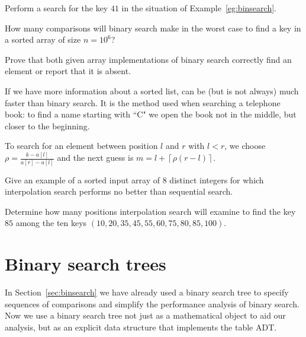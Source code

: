 \begin{Exercise}
\label{ex:binsearch}
Perform a search for the key $41$ in the situation of 
Example~\ref{eg:binsearch}.
\end{Exercise}

\begin{Exercise}\label{exr:binsearch:comp}
How many comparisons will binary search make in the
worst case to find a key in a sorted array of size \(n=10^6\)?
\end{Exercise}

\begin{Exercise}\label{exr:binary-search-correct}
Prove that both given array implementations of binary search correctly find an 
element or report that it is absent.
\end{Exercise}

\begin{Exercise}\label{exr:interpol-search-bad}
If we have more information about a sorted list,  
can be (but is not always) much faster than binary search. It is the method 
used when searching a telephone 
book: to find a name starting with ``C" we open the book not in the middle, but 
closer to the beginning. 

To search for an element between position $l$ and $r$ with $l < r$, we choose 
\(\rho = \frac{ k - a[l]}{a[r] - a[l]}\)
and the next guess is  
\(
m = l + 
\left \lceil \rho (r - l) \right \rceil.
\)

Give an example of a sorted input array of $8$ distinct integers 
for which interpolation search performs no better than sequential search.
\end{Exercise}

\begin{Exercise}\label{exr:interpol:search}
Determine how many positions interpolation search will
examine to find the key \(85\) among the ten keys 
\((10,20,35,45,55,60,75,80,85,100)\).
\end{Exercise}

\section{Binary search trees}
\label{bin-search-tree}

In Section~\ref{sec:binsearch} we have already used a binary search
tree to specify sequences of comparisons and simplify the performance
analysis of binary search. Now we use a binary search tree not just as a mathematical 
object to aid our analysis, but as an explicit data structure that implements the 
table ADT. 

